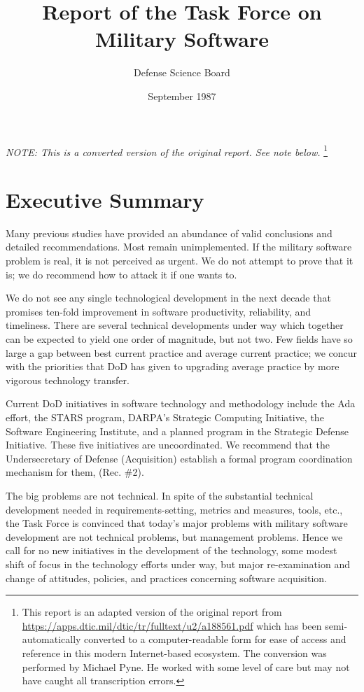 \documentclass[12pt,final]{article}
\begin{document}
\tableofcontents
\thispagestyle{empty}

\newpage
{}

\title{Report of the Task Force on Military Software}
\author{Defense Science Board}
\date{September 1987}

\maketitle

\emph{NOTE: This is a converted version of the original report. See note below.}
\footnote{This report is an adapted version of the original report from
\url{https://apps.dtic.mil/dtic/tr/fulltext/u2/a188561.pdf} which has been
semi-automatically converted to a computer-readable form for ease of access and
reference in this modern Internet-based ecosystem. The conversion was performed
by Michael Pyne. He worked with some level of care but may not have caught all
transcription errors.}

\section{Executive Summary}

Many previous studies have provided an abundance of valid conclusions and
detailed recommendations. Most remain unimplemented. If the military software
problem is real, it is not perceived as urgent. We do not attempt to prove
that it is; we do recommend how to attack it if one wants to.

We do not see any single technological development in the next decade that
promises ten-fold improvement in software productivity, reliability, and
timeliness. There are several technical developments under way which together
can be expected to yield one order of magnitude, but not two. Few fields have
so large a gap between best current practice and average current practice; we
concur with the priorities that DoD has given to upgrading average practice by
more vigorous technology transfer.

Current DoD initiatives in software technology and methodology include the Ada
effort, the STARS program, DARPA’s Strategic Computing Initiative, the
Software Engineering Institute, and a planned program in the Strategic Defense
Initiative. These five initiatives are uncoordinated. We recommend that the
Undersecretary of Defense (Acquisition) establish a formal program
coordination mechanism for them, (Rec. \#2).

The big problems are not technical. In spite of the substantial technical
development needed in requirements-setting, metrics and measures, tools, etc.,
the Task Force is convinced that today’s major problems with military software
development are not technical problems, but management problems. Hence we call
for no new initiatives in the development of the technology, some modest shift
of focus in the technology efforts under way, but major re-examination and
change of attitudes, policies, and practices concerning software acquisition.
\end{document}
